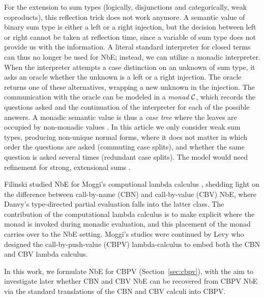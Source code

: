 \documentclass[a4paper,USenglish,cleveref, autoref]{lipics-v2019}
\begin{document}
For the extension to sum types (logically, disjunctions and categorically,
weak coproducts), this reflection trick does not work anymore.  A
semantic value of binary sum type is either a left or a right
injection, but the decision between left or right cannot be taken at
reflection time, since a variable of sum type does not provide us with
the information.  A literal standard interpreter for closed terms can
thus no longer be used for NbE;  instead, we can utilize a monadic
interpreter.  When the interpreter attempts a case distinction on an
unknown of sum type, it asks an oracle whether the unknown is a left
or a right injection.  The oracle returns one of these alternatives,
wrapping a new unknown in the injection.  The communication with the
oracle can be modeled in a \emph{monad} $\mathcal{C}$,
which records the questions asked and the continuation of the
interpreter for each of the possible answers.
A monadic semantic value is thus a \emph{case tree} where the leaves
are occupied by non-monadic values \cite{altenkirchUustalu:flops04}.
In this article we only consider weak sum types, producing non-unique
normal forms, where it does not
matter in which order the questions are asked (commuting case splits),
and whether the same
question is asked several times (redundant case splits).
The model would need refinement for strong, extensional sums
\cite{altenkirchDybjerHofmannScott:lics01,altenkirchUustalu:flops04,balatDiCosmoFiore:popl04,barral:PhD,scherer:popl17}.

Filinski \cite{filinski:tlca01} studied NbE for Moggi's computional lambda
calculus \cite{moggi:infcomp91}, shedding light on the difference
between call-by-name (CBN) and call-by-value (CBV) NbE, where Danvy's
type-directed partial evaluation \cite{danvy:popl96} falls into the
latter class.  The contribution of the computational lambda calculus
is to make explicit where the monad is invoked during monadic
evaluation, and this placement of the monad carries over to the NbE
setting.  Moggi's studies were continued by Levy \cite{levy:hosc06}
who designed the call-by-push-value (CBPV) lambda-calculus to embed
both the CBN and CBV lambda calculus.

In this work, we formulate NbE for CBPV
(Section~\ref{sec:cbpv}), with the aim to investigate
later whether CBN and CBV NbE can be recovered from CBPV NbE via the
standard translations of the CBN and CBV calculi into CBPV.
\end{document}
